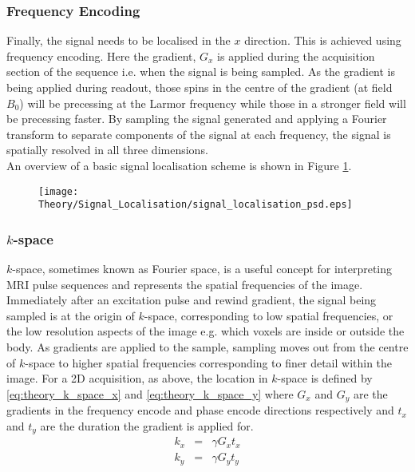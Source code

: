 \subsubsection{Frequency Encoding}
Finally, the signal needs to be localised in the $x$ direction. This is achieved using frequency encoding.
Here the gradient, $G_x$ is applied during the acquisition section of the sequence i.e. when the signal is being sampled. As the gradient is being applied during readout, those spins in the centre of the gradient (at field $B_0$) will be precessing at the Larmor frequency while those in a stronger field will be precessing faster. By sampling the signal generated and applying a Fourier transform to separate components of the signal at each frequency, the signal is spatially resolved in all three dimensions.\\

An overview of a basic signal localisation scheme is shown in Figure \ref{fig:theory_signal_loc}.
\begin{figure}[H]
	\centering
	\texttt{[image: Theory/Signal\_Localisation/signal\_localisation\_psd.eps]}
	\caption{}
	\label{fig:theory_signal_loc}	
\end{figure}

\subsubsection{$k$-space}
$k$-space, sometimes known as Fourier space, is a useful concept for interpreting \ac{MRI} pulse sequences and represents the spatial frequencies of the image. Immediately after an excitation pulse and rewind gradient, the signal being sampled is at the origin of $k$-space, corresponding to low spatial frequencies, or the low resolution aspects of the image e.g. which voxels are inside or outside the body. As gradients are applied to the sample, sampling moves out from the centre of $k$-space to higher spatial frequencies corresponding to finer detail within the image. For a 2D acquisition, as above, the location in $k$-space is defined by \eqref{eq:theory_k_space_x} and \eqref{eq:theory_k_space_y} where $G_x$ and $G_y$ are the gradients in the frequency encode and phase encode directions respectively and $t_x$ and $t_y$ are the duration the gradient is applied for.
\begin{eqnarray}
k_x &=& \gamma G_x t_x
\label{eq:theory_k_space_x} \\
k_y &=& \gamma G_y t_y
\label{eq:theory_k_space_y}
\end{eqnarray}\\

